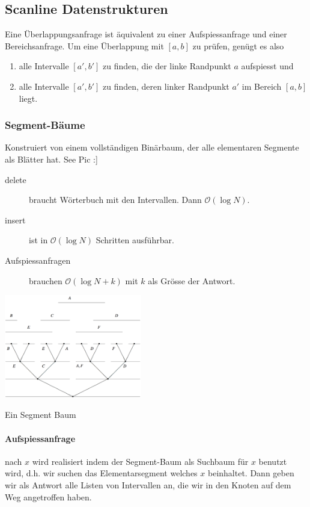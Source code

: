 \documentclass[a4paper, 9pt, DIV=20]{scrartcl}
\newcommand{\Oh}{\mathcal{O}}
\begin{document}
\subsection{Scanline Datenstrukturen}

Eine Überlappungsanfrage ist äquivalent zu einer Aufspiessanfrage und einer Bereichsanfrage. Um eine Überlappung mit $[a,b]$ zu prüfen, genügt es also
\begin{enumerate}
\item alle Intervalle $[a',b']$ zu finden, die der linke Randpunkt $a$ aufspiesst und
\item alle Intervalle $[a',b']$ zu finden, deren linker Randpunkt $a'$ im Bereich $[a,b]$ liegt.
\end{enumerate}

\subsubsection{Segment-Bäume}
Konstruiert von einem vollständigen Binärbaum, der alle elementaren Segmente als Blätter hat. See Pic :]

\begin{description}
\item[delete] braucht Wörterbuch mit den Intervallen. Dann $\Oh(\log{N})$.
\item[insert]ist in $\Oh(\log{N})$ Schritten ausführbar.
\item[Aufspiessanfragen]brauchen $\Oh(\log{N}+k)$ mit $k$ als Grösse der Antwort.	
\end{description}

\begin{center}
\includegraphics[width=6cm]{SegmentBaum}

Ein Segment Baum
\end{center}

\paragraph{Aufspiessanfrage} nach $x$ wird realisiert indem der Segment-Baum als Suchbaum für $x$ benutzt wird, d.h. wir suchen das Elementarsegment welches $x$ beinhaltet. Dann geben wir als Antwort alle Listen von Intervallen an, die wir in den Knoten auf dem Weg angetroffen haben.
\end{document}
